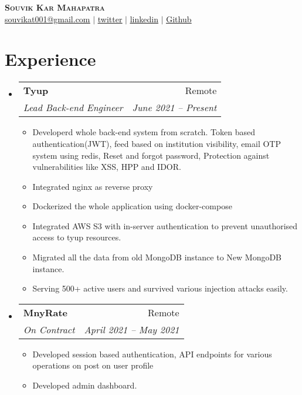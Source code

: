 \documentclass[letterpaper,11pt]{article}
\makeatletter
\newcommand{\resumeItem}[1]{
  \item\small{
    {#1 \vspace{-2pt}}
  }
}
\newcommand{\resumeSubheading}[4]{
  \vspace{-2pt}\item
    \begin{tabular*}{0.97\textwidth}[t]{l@{\extracolsep{\fill}}r}
      \textbf{#1} & #2 \\
      \textit{\small#3} & \textit{\small #4} \\
    \end{tabular*}\vspace{-7pt}
}
\newcommand{\resumeSubSubheading}[2]{
    \item
    \begin{tabular*}{0.97\textwidth}{l@{\extracolsep{\fill}}r}
      \textit{\small#1} & \textit{\small #2} \\
    \end{tabular*}\vspace{-7pt}
}
\newcommand{\resumeSubHeadingListStart}{\begin{itemize}[leftmargin=0.15in, label={}]}
\newcommand{\resumeSubHeadingListEnd}{\end{itemize}}
\newcommand{\resumeItemListStart}{\begin{itemize}}
\newcommand{\resumeItemListEnd}{\end{itemize}\vspace{-5pt}}
\makeatother
\begin{document}

\begin{center}
    \textbf{\Huge \scshape Souvik Kar Mahapatra} \\ \vspace{1pt}
    \href{mailto:souvikat001@gmail.com}{\underline{souvikat001@gmail.com}} $|$ 
    \href{https://twitter.com/souvikinator}{\underline{twitter}} $|$ 
    \href{https://linkedin.com/in/souvik-kar-mahapatra}{\underline{linkedin}} $|$
    \href{https://github.com/souvikinator}{\underline{Github}}
    
\end{center}


\section{Experience}
  \resumeSubHeadingListStart
    \resumeSubheading
      {Tyup}{Remote}
      {Lead Back-end Engineer}{June 2021 -- Present}
      \resumeItemListStart
        \resumeItem{Developerd whole back-end system from scratch. Token based authentication(JWT), feed based on institution visibility, email OTP system using redis, Reset and forgot password, Protection against vulnerabilities like XSS, HPP and IDOR.}
        \resumeItem{Integrated nginx as reverse proxy }
        \resumeItem{Dockerized the whole application using docker-compose}
        \resumeItem{Integrated AWS S3 with in-server authentication to prevent unauthorised access to tyup resources.}
        \resumeItem{Migrated all the data from old MongoDB instance to New MongoDB instance.}
        \resumeItem{Serving 500+ active users and survived various injection attacks easily.}
        
    
      \resumeItemListEnd
    \resumeSubheading
      {MnyRate}{Remote}
      {On Contract}{April 2021 -- May 2021}
      \resumeItemListStart
        \resumeItem{Developed session based authentication, API endpoints for various operations on post on user profile}
        \resumeItem{Developed admin dashboard.}
     \resumeItemListEnd
  \resumeSubHeadingListEnd
\end{document}
